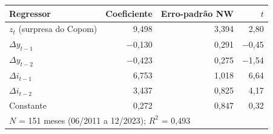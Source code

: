 \begin{tabular}{lrrr}
\toprule
Regressor & Coeficiente & Erro-padrão NW & $t$ \\
\midrule
$z_t$ (surpresa do Copom) & 9{,}498 & 3{,}394 & 2{,}80 \\
$\Delta y_{t-1}$ & \ensuremath{-}0{,}130 & 0{,}291 & \ensuremath{-}0{,}45 \\
$\Delta y_{t-2}$ & \ensuremath{-}0{,}423 & 0{,}275 & \ensuremath{-}1{,}54 \\
$\Delta i_{t-1}$ & 6{,}753 & 1{,}018 & 6{,}64 \\
$\Delta i_{t-2}$ & 3{,}437 & 0{,}825 & 4{,}17 \\
Constante & 0{,}272 & 0{,}847 & 0{,}32 \\
\midrule
\multicolumn{4}{l}{$N$ = 151 meses (06/2011 a 12/2023); $R^2$ = 0{,}493} \\
\bottomrule
\end{tabular}
